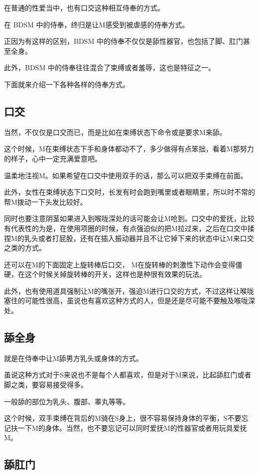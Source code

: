 \documentclass[12pt,UTF8]{ctexbook}
\begin{document}
在普通的性爱当中，也有口交这种相互侍奉的方式。

在 BDSM 中的侍奉，终归是让M感受到被虐感的侍奉方式。

正因为有这样的区别，BDSM 中的侍奉不仅仅是舔性器官，也包括了脚、肛门甚至全身。

此外，BDSM 中的侍奉往往混合了束缚或者羞辱，这也是特征之一。

下面就来介绍一下各种各样的侍奉方式。 

\subsection{口交}

当然，不仅仅是口交而已，而是比如在束缚状态下命令或是要求M来舔。

这个时候，M在束缚状态下手和身体都动不了，多少做得有点笨拙，看着M那努力的样子，心中一定充满爱意吧。

温柔地注视M。如果希望在口交中使用双手的话，那么可以把双手束缚在前面。

此外，女性在束缚状态下口交时，长发有时会跑到嘴里或者眼睛里，所以时不常的帮M拨动一下头发比较好。

同时也要注意阴茎如果进入到喉咙深处的话可能会让M呛到。口交中的爱抚，比较有代表性的为是，在使用项圈的时候，有点强迫似的把M拉过来，之后在口交中揉捏M的乳头或者打屁股，还有在插入振动器并且不让它掉下来的状态中让M来口交之类的方式。

还可以在M的下面固定上旋转棒后口交， M在旋转棒的刺激性下动作会变得僵硬，在这个时候关掉旋转棒的开关，这样也是种很有效果的玩法。

此外，也有使用道具强制让M的嘴张开，强迫M进行口交的方式，不过这样让喉咙塞住的可能性很高，虽说也有喜欢这种方式的人，但是还是尽可能不要触及喉咙深处。

\subsection{舔全身}

就是在侍奉中让M舔男方乳头或身体的方式。

虽说这种方式对于S来说也不是每个人都喜欢，但是对于M来说，比起舔肛门或者脚之类，要容易接受得多。

一般舔的部位为乳头、腹部、睾丸等等。

这个时候，双手束缚在背后的M骑在S身上，很不容易保持身体的平衡，S不要忘记扶一下M的身体。当然，也不要忘记可以同时爱抚M的性器官或者用玩具爱抚M。 

\subsection{舔肛门}
\end{document}
